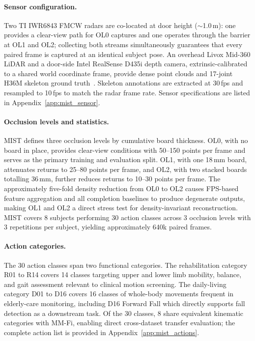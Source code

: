 \documentclass{article}
\begin{document}
\paragraph{Sensor configuration.}
Two TI IWR6843 FMCW radars are co-located at door height ($\sim$1.0\,m):
one provides a clear-view path for OL0 captures and one operates through
the barrier at OL1 and OL2; collecting both streams simultaneously
guarantees that every paired frame is captured at an identical subject pose.
An overhead Livox Mid-360 LiDAR and a door-side Intel RealSense D435i
depth camera, extrinsic-calibrated to a shared world coordinate frame,
provide dense point clouds and 17-joint H36M skeleton ground truth~\cite{h36m}.
Skeleton annotations are extracted at 30\,fps and resampled to 10\,fps
to match the radar frame rate.
Sensor specifications are listed in Appendix~\ref{app:mist_sensor}.

\paragraph{Occlusion levels and statistics.}
MIST defines three occlusion levels by cumulative board thickness.
OL0, with no board in place, provides clear-view conditions with
50--150 points per frame and serves as the primary training and evaluation split.
OL1, with one 18\,mm board, attenuates returns to 25--80 points per frame,
and OL2, with two stacked boards totalling 36\,mm, further reduces returns
to 10--30 points per frame.
The approximately five-fold density reduction from OL0 to OL2 causes
FPS-based feature aggregation and all completion baselines to produce
degenerate outputs, making OL1 and OL2 a direct stress test for
density-invariant reconstruction.
MIST covers 8 subjects performing 30 action classes across 3 occlusion
levels with 3 repetitions per subject, yielding approximately 640k
paired frames.

\paragraph{Action categories.}
The 30 action classes span two functional categories.
The rehabilitation category R01 to R14 covers 14 classes targeting
upper and lower limb mobility, balance, and gait assessment relevant
to clinical motion screening.
The daily-living category D01 to D16 covers 16 classes of whole-body
movements frequent in elderly-care monitoring, including D16 Forward
Fall which directly supports fall detection as a downstream task.
Of the 30 classes, 8 share equivalent kinematic categories with MM-Fi,
enabling direct cross-dataset transfer evaluation; the complete action
list is provided in Appendix~\ref{app:mist_actions}.
\end{document}
